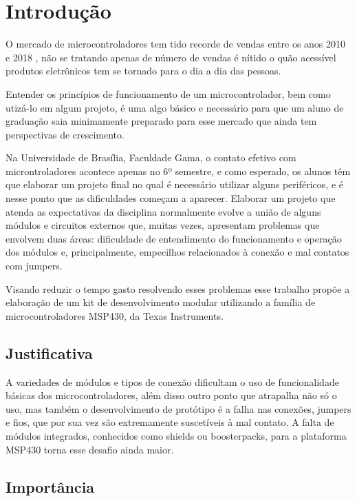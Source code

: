 \chapter[Introdução]{Introdução}

O mercado de microcontroladores tem tido recorde de vendas entre os anos 2010 e 2018 \cite{Lineback2019}, não se tratando apenas de número de vendas é nítido o quão acessível produtos eletrônicos tem se tornado para o dia a dia das pessoas.

Entender os princípios de funcionamento de um microcontrolador, bem como utizá-lo em algum projeto, é uma algo básico e necessário para que um aluno de graduação saia minimamente preparado para esse mercado que ainda tem perspectivas de crescimento.

Na Universidade de Brasília, Faculdade Gama, o contato efetivo com microntroladores acontece apenas no 6º semestre, e como esperado, os alunos têm que elaborar um projeto final no qual é necessário utilizar alguns periféricos, e é nesse ponto que as dificuldades começam a aparecer. Elaborar um projeto que atenda as expectativas da disciplina normalmente evolve a união de alguns módulos e circuitos externos que, muitas vezes, apresentam problemas que envolvem duas áreas: dificuldade de entendimento do funcionamento e operação dos módulos e, principalmente, empecilhos relacionados à conexão e mal contatos com jumpers.

Visando reduzir o tempo gasto resolvendo esses problemas esse trabalho propõe a elaboração de um kit de desenvolvimento modular utilizando a família de microcontroladores MSP430, da Texas Instruments.

\section{Justificativa}

A variedades de módulos e tipos de conexão dificultam o uso de funcionalidade básicas dos microcontroladores, além disso outro ponto que atrapalha não só o uso, mas também o desenvolvimento de protótipo é a falha nas conexões, jumpers e fios, que por sua vez são extremamente suscetíveis à mal contato. A falta de módulos integrados, conhecidos como shields ou boosterpacks, para a plataforma MSP430 torna esse desafio ainda maior.

\section{Importância}

